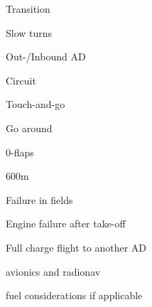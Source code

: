 \documentclass{checklists}
\begin{document}
\vfill
\begin{CheckListRule}{Transition}{}%
\renewcommand{\labelenumi}{\Square\Square\Square}
	\item Slow turns
	\item Out-/Inbound AD
	\item Circuit
	\item Touch-and-go
	\item Go around
	\item 0-flaps
	\item 600m
	\item Failure in fields
	\item Engine failure after take-off
	\item Full charge flight to another AD
	\item avionics and radionav
	\item fuel considerations if applicable
\end{CheckListRule}
\SkipPage
\end{document}
